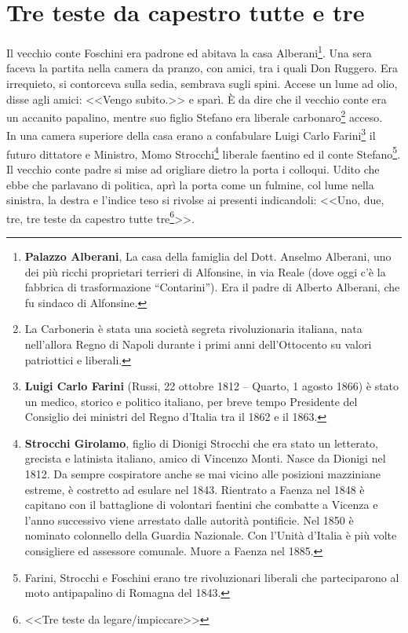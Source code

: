 
\chapter{Tre teste da capestro tutte e tre}
Il vecchio conte Foschini era padrone ed abitava la casa Alberani\footnote{\textbf{Palazzo Alberani}, La casa della famiglia del Dott. Anselmo Alberani, uno dei più ricchi proprietari terrieri di Alfonsine, in via Reale (dove oggi c'è la fabbrica di trasformazione “Contarini”). Era il padre di Alberto Alberani, che fu sindaco di Alfonsine.}. Una sera faceva la partita nella camera da pranzo, con amici, tra i quali Don Ruggero. Era irrequieto, si contorceva sulla sedia, sembrava sugli spini. Accese un lume ad olio, disse agli amici: <<Vengo subito.>> e sparì. È da dire che il vecchio conte era un accanito papalino, mentre suo figlio Stefano era liberale carbonaro\footnote{La Carboneria è stata una società segreta rivoluzionaria italiana, nata nell'allora Regno di Napoli durante i primi anni dell'Ottocento su valori patriottici e liberali.} acceso. \\
\indent In una camera superiore della casa erano a confabulare Luigi Carlo Farini\footnote{\textbf{Luigi Carlo Farini} (Russi, 22 ottobre 1812 – Quarto, 1 agosto 1866) è stato un medico, storico e politico italiano, per breve tempo Presidente del Consiglio dei ministri del Regno d'Italia tra il 1862 e il 1863.} il futuro dittatore e Ministro, Momo Strocchi\footnote{\textbf{Strocchi Girolamo}, figlio di Dionigi Strocchi che era stato un letterato, grecista e latinista italiano, amico di Vincenzo Monti. Nasce da Dionigi nel 1812. Da sempre cospiratore anche se mai vicino alle posizioni mazziniane estreme, è costretto ad esulare nel 1843. Rientrato a Faenza nel 1848 è capitano con il battaglione di volontari faentini che combatte a Vicenza e l'anno successivo viene arrestato dalle autorità pontificie. Nel 1850 è nominato colonnello della Guardia Nazionale. Con l'Unità d'Italia è più volte consigliere ed assessore comunale. Muore a Faenza nel 1885.} liberale faentino ed il conte Stefano\footnote{Farini, Strocchi e Foschini erano tre rivoluzionari liberali che parteciparono al moto antipapalino di Romagna del 1843.}. Il vecchio conte padre si mise ad origliare dietro la porta i colloqui. Udito che ebbe che parlavano di politica, aprì la porta come un fulmine, col lume nella sinistra, la destra e l'indice teso si rivolse ai presenti indicandoli: <<Uno, due, tre, tre teste da capestro tutte tre\footnote{<<Tre teste da legare/impiccare>>}>>.\\
